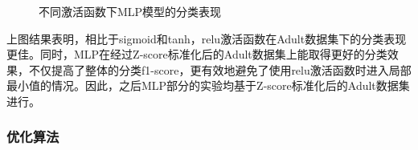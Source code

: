 \documentclass[12pt,a4paper]{article}
\theoremstyle{definition}
\begin{document}
\begin{figure}[H]
	\centering
	\caption{不同激活函数下MLP模型的分类表现}
	\label{fig:mlp-activate1}
\end{figure}

上图结果表明，相比于sigmoid和tanh，relu激活函数在Adult数据集下的分类表现更佳。同时，MLP在经过Z-score标准化后的Adult数据集上能取得更好的分类效果，不仅提高了整体的分类f1-score，更有效地避免了使用relu激活函数时进入局部最小值的情况。因此，之后MLP部分的实验均基于Z-score标准化后的Adult数据集进行。

\subsubsection{优化算法}
\end{document}
